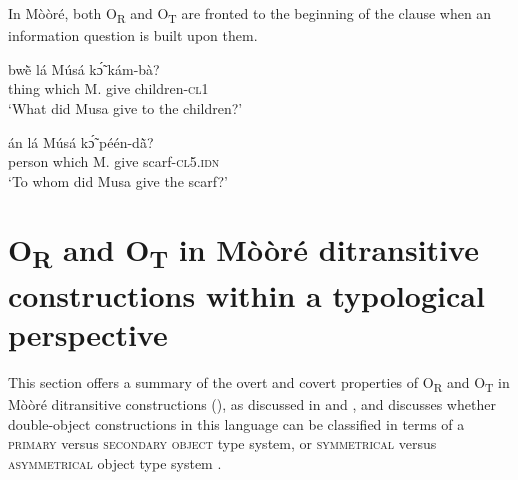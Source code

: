 \documentclass[output=paper]{langsci/langscibook}
\begin{document}
In M\`{o}\`{o}r\'{e}, both O\textsubscript{R} and O\textsubscript{T} are fronted to the beginning of the clause when an information question is built upon them. 

\ea
\label{ex:45.pacchiarotti}
\gll bw\`{\~{e}}    l\'{a}    M\'{u}s\'{a}  kɔ̃́  k\'{a}m-b\`{a}?  \\
thing    which    M.  give  children-\textsc{cl1}\\
\glt `What did Musa give to the children?'
\z

\ea
\label{ex:46.pacchiarotti}
\gll \'{a}n    l\'{a}    M\'{u}s\'{a}  kɔ̃́  p\'{e}\'{e}n-d\`{\~{a}}? \\
person  which    M.  give  scarf-\textsc{cl5.idn}\\
\glt `To whom did Musa give the scarf?'
\z

\section{O\textsubscript{R} and O\textsubscript{T} in M\`{o}\`{o}r\'{e} ditransitive constructions within a typological perspective}\label{§6:or.pacchiarotti}

This section offers a summary of the overt and covert properties of O\textsubscript{R} and O\textsubscript{T} in M\`{o}\`{o}r\'{e} ditransitive constructions (), as discussed in  and , and discusses whether double-object constructions in this language can be classified in terms of a \textsc{primary} versus \textsc{secondary object }\citep{dryer1986} type system, or \textsc{symmetrical} versus \textsc{asymmetrical} object type system \citep{bresnanmoshi1990}.
\end{document}
